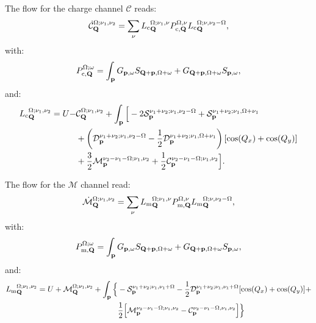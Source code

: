 The flow for the charge channel $\mathcal{C}$ reads:
\begin{equation}
\dot{\mathcal{C}}_{\mathbf{Q}}^{\Omega;\nu_1,\nu_2} = \sum_{\nu}{L_\mathrm{c}}^{\Omega; \nu_1,\nu}_{\mathbf{Q}} P_{\mathrm{c},\mathbf{Q}}^{\Omega,\nu} {L_\mathrm{c}}^{\Omega; \nu,\nu_2-\Omega}_{\mathbf{Q}}, 
\end{equation} 	   
with: 
\begin{equation}
P_{\mathrm{c},\mathbf{Q}}^{\Omega;\omega} = \int_{\mathbf{p}}  G_{\mathbf{p},\omega}S_{\mathbf{Q}+\mathbf{p},\Omega+\omega} +G_{\mathbf{Q}+\mathbf{p},\Omega+\omega}
S_{\mathbf{p},\omega},
\end{equation} 
and: 
\begin{align} 
{L_\mathrm{c}}^{\Omega;\nu_1,\nu_2}_{\mathbf{Q}}=U-&\mathcal{C}_{\mathbf{Q}}^{\Omega;\nu_1,\nu_2} 
+ \int_{\mathbf{p}} \Big [
- 2 \mathcal{S}_{\mathbf{p}}^{\nu_1+\nu_2;\nu_1,\nu_2-\Omega} + \mathcal{S}_{\mathbf{p}}^{\nu_1+\nu_2;\nu_1,\Omega+\nu_1}
\\ &+ \left( \mathcal{D}_{\mathbf{p}}^{\nu_1+\nu_2;\nu_1,\nu_2-\Omega} -\frac{1}{2} \mathcal{D}_{\mathbf{p}}^{\nu_1+\nu_2;\nu_1,\Omega+\nu_1} \right) [\cos(Q_x)+\cos(Q_y)]
\\ &+ \frac{3}{2} \mathcal{M}_{\mathbf{p}}^{\nu_2-\nu_1-\Omega;\nu_1,\nu_2} 
+ \frac{1}{2} \mathcal{C}_{\mathbf{p}}^{\nu_2-\nu_1-\Omega;\nu_1,\nu_2} \Big].
\end{align}	 

The flow for the $\mathcal{M}$ channel read:
\begin{equation}
\dot{\mathcal{M}}_{\mathbf{Q}}^{\Omega;\nu_1,\nu_2} = \sum_{\nu}{L_\mathrm{m}}^{\Omega; \nu_1,\nu}_{\mathbf{Q}} P_{\mathrm{m},\mathbf{Q}}^{\Omega,\nu} {L_\mathrm{m}}^{\Omega; \nu,\nu_2-\Omega}_{\mathbf{Q}}, 
\end{equation} 	   
with: 
\begin{equation}
P_{\mathrm{m},\mathbf{Q}}^{\Omega;\omega} = \int_{\mathbf{p}}  G_{\mathbf{p},\omega}S_{\mathbf{Q}+\mathbf{p},\Omega+\omega} +G_{\mathbf{Q}+\mathbf{p},\Omega+\omega}
S_{\mathbf{p},\omega},
\end{equation} 
and: 
\begin{align} 
{L_\mathrm{m}}^{\Omega;\nu_1,\nu_2}_{\mathbf{Q}}=U+\mathcal{M}_{\mathbf{Q}}^{\Omega;\nu_1,\nu_2} 
+ \int_{\mathbf{p}} \Big \{& - \mathcal{S}_{\mathbf{p}}^{\nu_1+\nu_2;\nu_1,\nu_1+\Omega}  
-\frac{1}{2} \mathcal{D}_{\mathbf{p}}^{\nu_1+\nu_2;\nu_1,\nu_1+\Omega}
[\cos(Q_x)+\cos(Q_y)] + \\
&\frac{1}{2} \Big[  \mathcal{M}_{\mathbf{p}}^{\nu_2-\nu_1-\Omega; \nu_1,\nu_2} 
- \mathcal{C}_{\mathbf{p}}^{\nu_2-\nu_1-\Omega,\nu_1,\nu_2} \Big] 
\Big \} 
\end{align}	 
